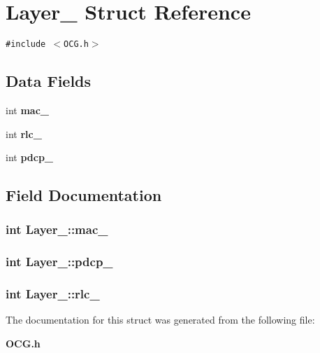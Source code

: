 \section{Layer\_\- Struct Reference}
\label{structLayer__}
{\tt \#include $<$OCG.h$>$}

\subsection*{Data Fields}
\begin{CompactItemize}
\item 
int {\bf mac\_\-}
\item 
int {\bf rlc\_\-}
\item 
int {\bf pdcp\_\-}
\end{CompactItemize}


\subsection{Field Documentation}
\subsubsection[{mac\_\-}]{\setlength{\rightskip}{0pt plus 5cm}int {\bf Layer\_\-::mac\_\-}}\label{structLayer___55c1299b3dbbe4a86c62a86a3ae8ac16}


\subsubsection[{pdcp\_\-}]{\setlength{\rightskip}{0pt plus 5cm}int {\bf Layer\_\-::pdcp\_\-}}\label{structLayer___12894b206b273c8c1ba6f066b72dd630}


\subsubsection[{rlc\_\-}]{\setlength{\rightskip}{0pt plus 5cm}int {\bf Layer\_\-::rlc\_\-}}\label{structLayer___9bf62174eb571360f5ff1978ae53110b}




The documentation for this struct was generated from the following file:\begin{CompactItemize}
\item 
{\bf OCG.h}\end{CompactItemize}
